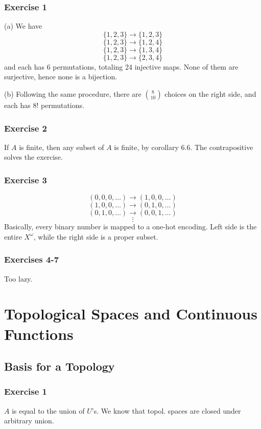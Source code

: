 \documentclass{book}
\begin{document}
\subsection*{Exercise 1}
(a)
We have
$$\{ 1, 2, 3 \} \rightarrow \{ 1, 2, 3 \}$$
$$\{ 1, 2, 3 \} \rightarrow \{ 1, 2, 4 \}$$
$$\{ 1, 2, 3 \} \rightarrow \{ 1, 3, 4 \}$$
$$\{ 1, 2, 3 \} \rightarrow \{ 2, 3, 4 \}$$
and each has 6 permutations, totaling 24 injective maps. None of them are surjective, hence none is a bijection.

\noindent
(b)
Following the same procedure, there are $\binom{8}{10}$ choices on the right side, and each has $8!$ permutations.

\subsection*{Exercise 2}
If $A$ is finite, then any subset of $A$ is finite, by corollary 6.6. The contrapositive solves the exercise.

\subsection*{Exercise 3}
$$(0, 0, 0, \ldots) \rightarrow (1, 0, 0, \ldots)$$
$$(1, 0, 0, \ldots) \rightarrow (0, 1, 0, \ldots)$$
$$(0, 1, 0, \ldots) \rightarrow (0, 0, 1, \ldots)$$
$$\vdots$$
Basically, every binary number is mapped to a one-hot encoding. Left side is the entire $X^\omega$, while the right side is a proper subset.

\subsection*{Exercises 4-7}
Too lazy.

\chapter{Topological Spaces and Continuous Functions}

\section{Basis for a Topology}

\subsection*{Exercise 1}
$A$ is equal to the union of $U$'s. We know that topol. spaces are closed under arbitrary union.
\end{document}

